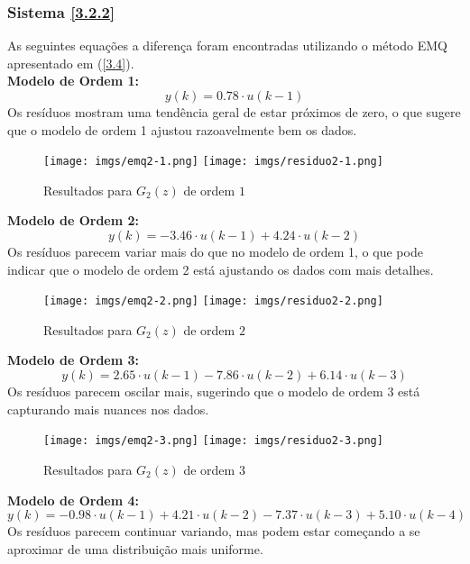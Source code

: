 \documentclass[a4paper,12pt]{article}
\begin{document}
\subsubsection{Sistema \ref{3.2.2}}

As seguintes equações a diferença foram encontradas utilizando o método EMQ apresentado em (\ref{3.4}).\\

\noindent \textbf{Modelo de Ordem 1:}
\begin{equation*}
   y(k) = 0.78 \cdot u(k-1)\tag{4.4.2.1}
\end{equation*}
Os resíduos mostram uma tendência geral de estar próximos de zero, o que sugere que o modelo de ordem 1 ajustou razoavelmente bem os dados.

\begin{figure}[h!]
\begin{center}
	\texttt{[image: imgs/emq2-1.png]} \quad
	\texttt{[image: imgs/residuo2-1.png]}
\caption{Resultados para $G_2(z)$ de ordem $1$} \label{fig11}
\end{center}
\end{figure}
\newpage
\noindent \textbf{Modelo de Ordem 2:}
\begin{equation*}
    y(k) = -3.46 \cdot u(k-1) + 4.24 \cdot u(k-2)\tag{4.4.2.2}
\end{equation*}
Os resíduos parecem variar mais do que no modelo de ordem 1, o que pode indicar que o modelo de ordem 2 está ajustando os dados com mais detalhes.

\begin{figure}[h!]
\begin{center}
	\texttt{[image: imgs/emq2-2.png]} \quad
	\texttt{[image: imgs/residuo2-2.png]}
\caption{Resultados para $G_2(z)$ de ordem $2$} \label{fig12}
\end{center}
\end{figure}

\noindent \textbf{Modelo de Ordem 3:}
\begin{equation*}
   y(k) = 2.65 \cdot u(k-1) - 7.86 \cdot u(k-2) + 6.14 \cdot u(k-3)\tag{4.4.2.3}
\end{equation*}
Os resíduos parecem oscilar mais, sugerindo que o modelo de ordem 3 está capturando mais nuances nos dados.

\begin{figure}[h!]
\begin{center}
	\texttt{[image: imgs/emq2-3.png]} \quad
	\texttt{[image: imgs/residuo2-3.png]}
\caption{Resultados para $G_2(z)$ de ordem $3$} \label{fig13}
\end{center}
\end{figure}
\newpage
\noindent \textbf{Modelo de Ordem 4:}
\begin{equation*}
   y(k) = -0.98 \cdot u(k-1) + 4.21 \cdot u(k-2) - 7.37 \cdot u(k-3) + 5.10 \cdot u(k-4)\tag{4.4.2.4}
\end{equation*}
Os resíduos parecem continuar variando, mas podem estar começando a se aproximar de uma distribuição mais uniforme.
\end{document}
